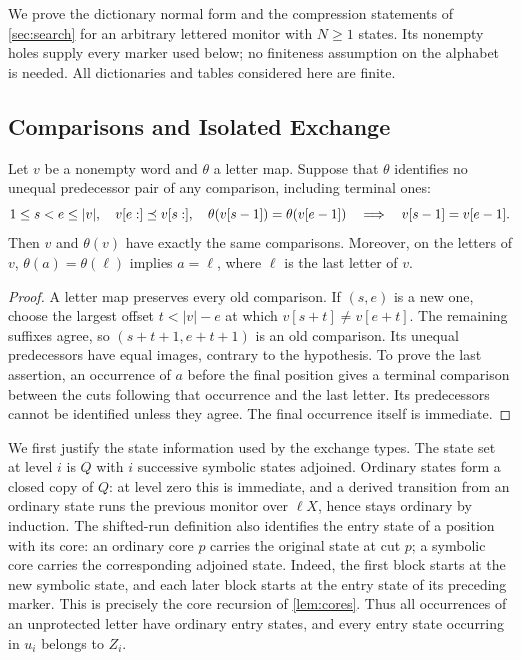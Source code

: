 We prove the dictionary normal form and the compression statements of \cref{sec:search}
for an arbitrary lettered monitor with $N\ge1$ states. Its nonempty holes
supply every marker used below; no finiteness assumption on the alphabet
is needed. All dictionaries and tables considered here are finite.

\subsection{Comparisons and Isolated Exchange}

\begin{lemma}\label{lem:comparison-map}
Let $v$ be a nonempty word and $\theta$ a letter map. Suppose that $\theta$ identifies
no unequal predecessor pair of any comparison, including terminal ones:
\[
 1\le s<e\le|v|,\quad v[e:]\preceq v[s:],\quad
 \theta(v[s-1])=\theta(v[e-1])\quad\Longrightarrow\quad v[s-1]=v[e-1].
\]
Then $v$ and $\theta(v)$ have exactly the same comparisons. Moreover, on the
letters of $v$, $\theta(a)=\theta(\ell)$ implies $a=\ell$, where $\ell$ is the
last letter of $v$.
\end{lemma}
\begin{proof}
A letter map preserves every old comparison. If $(s,e)$ is a new one,
choose the largest offset $t<|v|-e$ at which
$v[s+t]\ne v[e+t]$. The remaining suffixes agree, so
$(s+t+1,e+t+1)$ is an old comparison. Its unequal predecessors have equal
images, contrary to the hypothesis. To prove the last assertion, an
occurrence of $a$ before the final position gives a terminal comparison
between the cuts following that occurrence and the last letter. Its
predecessors cannot be identified unless they agree. The final occurrence
itself is immediate.
\end{proof}

We first justify the state information used by the exchange types.
The state set at level $i$ is $Q$ with $i$ successive symbolic states
adjoined. Ordinary states form a closed copy of $Q$: at level zero this
is immediate, and a derived transition from an ordinary state runs the
previous monitor over $\ell X$, hence stays ordinary by induction.
The shifted-run definition also identifies the entry state of a position
with its core: an ordinary core $p$ carries the original state at cut $p$;
a symbolic core carries the corresponding adjoined state. Indeed, the
first block starts at the new symbolic state, and each later block starts
at the entry state of its preceding marker. This is precisely the core
recursion of \cref{lem:cores}. Thus all occurrences of an unprotected
letter have ordinary entry states, and every entry state occurring in
$u_i$ belongs to $Z_i$.

